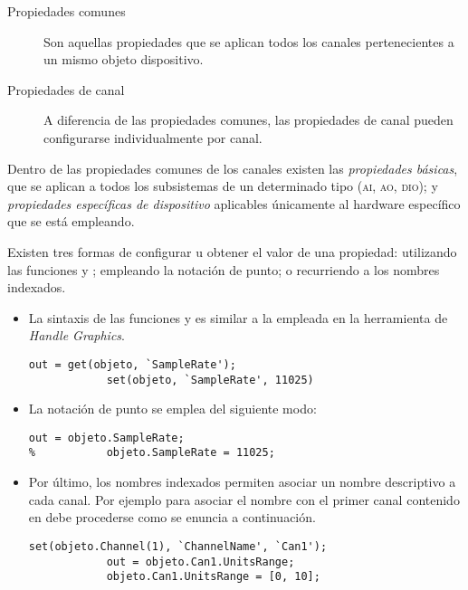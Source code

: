 \begin{description}
	\item[Propiedades comunes] Son aquellas propiedades que se aplican
		todos los canales pertenecientes a un mismo objeto
		dispositivo.
	\item[Propiedades de canal] A diferencia de las propiedades
		comunes, las propiedades de canal pueden configurarse
		individualmente por canal.
\end{description}

Dentro de las propiedades comunes de los canales existen las
\emph{propiedades básicas}, que se aplican a todos los subsistemas de un
determinado tipo (\textsc{ai, ao, dio}); y \emph{propiedades específicas de
dispositivo} aplicables únicamente al hardware específico que se está
empleando.

Existen tres formas de configurar u obtener el valor de una propiedad:
utilizando las funciones  y ; empleando la notación de
punto; o recurriendo a los nombres indexados.

\begin{itemize}
	\item La sintaxis de las funciones  y  es
		similar a la empleada en la herramienta de \matlab{}
		\emph{Handle Graphics}.

		\begin{lstlisting}[gobble=16]
			out = get(objeto, `SampleRate');
			set(objeto, `SampleRate', 11025)
		\end{lstlisting}

	\item La notación de punto se emplea del siguiente modo:

		\begin{lstlisting}[gobble=16]
			out = objeto.SampleRate;
% 			objeto.SampleRate = 11025;
		\end{lstlisting}

	\item Por último, los nombres indexados permiten asociar un nombre
		descriptivo a cada canal. Por ejemplo para asociar el
		nombre  con el primer canal contenido en
		 debe procederse como se enuncia a
		continuación.

		\begin{lstlisting}[gobble=16]
			set(objeto.Channel(1), `ChannelName', `Can1');
			out = objeto.Can1.UnitsRange;
			objeto.Can1.UnitsRange = [0, 10];
		\end{lstlisting}

\end{itemize}


